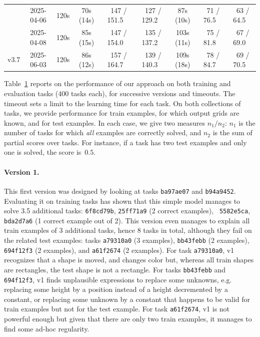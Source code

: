 \documentclass[a4paper]{llncs}
\begin{document}
\begin{table}[t]
\begin{tabular}{|c|c|c|c|c|c|c|c|c|}
     & 2025-04-06 & 120s & 70s (14s) & ~147 / 151.5~ & ~127 / 129.2~ & 87s (10s) & ~71 / 76.5~ & ~63 / 64.5~ \\
     & 2025-04-08 & 120s & 85s (15s) & ~147 / 154.0~ & ~135 / 137.2~ & 103s (11s) & ~75 / 81.8~ & ~67 / 69.0~ \\
    v3.7 & 2025-06-03 & 120s & 86s (12s) & ~157 / 164.7~ & ~139 / 140.3~ & 109s (18s) & ~78 / 84.7~ & ~69 / 70.5~ \\
    \hline
  \end{tabular}
  \label{tab:eval}
\end{table}

Table~\ref{tab:eval} reports on the performance of our approach on
both training and evaluation tasks (400 tasks each), for successive
versions and timeouts. The timeout sets a limit to the learning time
for each task. On both collections of tasks, we provide performance
for train examples, for which output grids are known, and for test
examples. In each case, we give two measures $n_1/n_2$: $n_1$ is the
number of tasks for which {\em all} examples are correctly solved, and
$n_2$ is the sum of partial scores over tasks. For instance, if a task
has two test examples and only one is solved, the score is~$0.5$.

\paragraph{Version 1.} This first version was designed by looking at
tasks {\tt ba97ae07} and {\tt b94a9452}. Evaluating it on training
tasks has shown that this simple model manages to solve 3.5 additional
tasks: {\tt 6f8cd79b}, {\tt 25ff71a9} (2 correct examples), {\tt
  5582e5ca}, {\tt bda2d7a6} (1 correct example out of 2). This version
even manages to explain all train examples of 3 additional tasks,
hence 8 tasks in total, although they fail on the related test
examples: tasks {\tt a79310a0} (3 examples), {\tt bb43febb} (2
examples), {\tt 694f12f3} (2 examples), and {\tt a61f2674} (2
examples). For task {\tt a79310a0}, v1 recognizes that a shape is
moved, and changes color but, whereas all train shapes are rectangles,
the test shape is not a rectangle. For tasks {\tt bb43febb} and {\tt
  694f12f3}, v1 finds unplausible expressions to replace some
unknowns, e.g. replacing some height by a position instead of a height
decremented by a constant, or replacing some unknown by a constant
that happens to be valid for train examples but not for the test
example. For task {\tt a61f2674}, v1 is not powerful enough but given
that there are only two train examples, it manages to find some ad-hoc
regularity.
\end{document}
